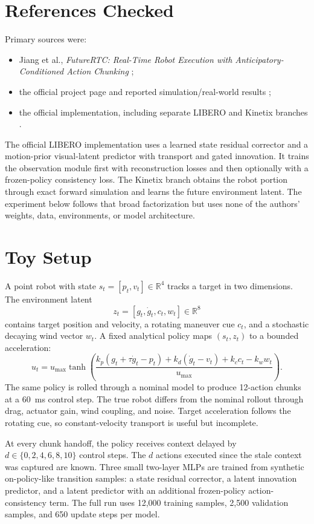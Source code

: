 \documentclass[11pt]{article}
\begin{document}
\section{References Checked}

Primary sources were:
\begin{itemize}[leftmargin=1.5em]
  \item Jiang et al., \emph{FutureRTC: Real-Time Robot Execution with Anticipatory-Conditioned Action Chunking} \cite{paper};
  \item the official project page and reported simulation/real-world results \cite{project};
  \item the official implementation, including separate LIBERO and Kinetix branches \cite{code}.
\end{itemize}

The official LIBERO implementation uses a learned state residual corrector and a motion-prior visual-latent predictor with transport and gated innovation. It trains the observation module first with reconstruction losses and then optionally with a frozen-policy consistency loss. The Kinetix branch obtains the robot portion through exact forward simulation and learns the future environment latent. The experiment below follows that broad factorization but uses none of the authors' weights, data, environments, or model architecture.

\section{Toy Setup}

A point robot with state $s_t=[p_t,v_t]\in\mathbb{R}^4$ tracks a target in two dimensions. The environment latent
\[
z_t=[g_t,\dot g_t,c_t,w_t]\in\mathbb{R}^8
\]
contains target position and velocity, a rotating maneuver cue $c_t$, and a stochastic decaying wind vector $w_t$. A fixed analytical policy maps $(s_t,z_t)$ to a bounded acceleration:
\[
u_t = u_{\max}\tanh\!\left(\frac{k_p(g_t+\tau\dot g_t-p_t)+k_d(\dot g_t-v_t)+k_c c_t-k_w w_t}{u_{\max}}\right).
\]
The same policy is rolled through a nominal model to produce 12-action chunks at a 60~ms control step. The true robot differs from the nominal rollout through drag, actuator gain, wind coupling, and noise. Target acceleration follows the rotating cue, so constant-velocity transport is useful but incomplete.

At every chunk handoff, the policy receives context delayed by $d\in\{0,2,4,6,8,10\}$ control steps. The $d$ actions executed since the stale context was captured are known. Three small two-layer MLPs are trained from synthetic on-policy-like transition samples: a state residual corrector, a latent innovation predictor, and a latent predictor with an additional frozen-policy action-consistency term. The full run uses 12,000 training samples, 2,500 validation samples, and 650 update steps per model.
\end{document}
